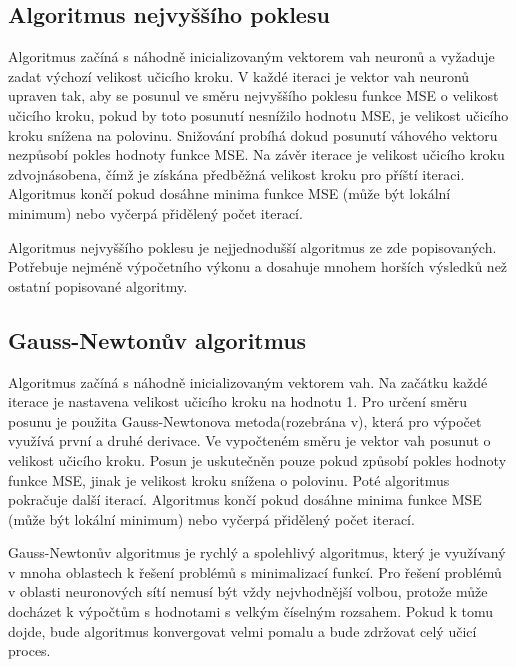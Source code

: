 \documentclass[11pt,twoside,a4paper]{book}
\begin{document}
\subsection{Algoritmus nejvyššího poklesu}
Algoritmus začíná s náhodně inicializovaným vektorem vah neuronů a vyžaduje zadat výchozí velikost učicího kroku. V každé iteraci je vektor vah neuronů upraven tak, aby se posunul ve směru nejvyššího poklesu funkce MSE o velikost učicího kroku, pokud by toto posunutí nesnížilo hodnotu MSE, je velikost učicího kroku snížena na polovinu. Snižování probíhá dokud posunutí váhového vektoru nezpůsobí pokles hodnoty funkce MSE.  Na závěr iterace je velikost učicího kroku zdvojnásobena, čímž je získána předběžná velikost kroku pro příští iteraci. Algoritmus končí pokud dosáhne minima funkce MSE (může být lokální minimum) nebo vyčerpá přidělený počet iterací.

Algoritmus nejvyššího poklesu je nejjednodušší algoritmus ze zde popisovaných. Potřebuje nejméně výpočetního výkonu a dosahuje mnohem horších výsledků než ostatní popisované algoritmy.\cite{nndocumentation}
\subsection{Gauss-Newtonův algoritmus}
Algoritmus začíná s náhodně inicializovaným vektorem vah. Na začátku každé iterace je nastavena velikost učicího kroku na hodnotu 1. Pro určení směru posunu je použita Gauss-Newtonova metoda(rozebrána v\citep{learningmachines}), která pro výpočet využívá první a druhé derivace. Ve vypočteném směru je vektor vah posunut o velikost učicího kroku. Posun je uskutečněn pouze pokud způsobí pokles hodnoty funkce MSE, jinak je velikost kroku snížena o polovinu. Poté algoritmus pokračuje další iterací. Algoritmus končí pokud dosáhne minima funkce MSE (může být lokální minimum) nebo vyčerpá přidělený počet iterací.

Gauss-Newtonův algoritmus je rychlý a spolehlivý algoritmus, který je využívaný v mnoha oblastech k řešení problémů s minimalizací funkcí. Pro řešení problémů v oblasti neuronových sítí nemusí být vždy nejvhodnější volbou, protože může docházet k výpočtům s hodnotami s velkým číselným rozsahem. Pokud k tomu dojde, bude algoritmus konvergovat velmi pomalu a bude zdržovat celý učicí proces.\cite{nndocumentation}
\end{document}
